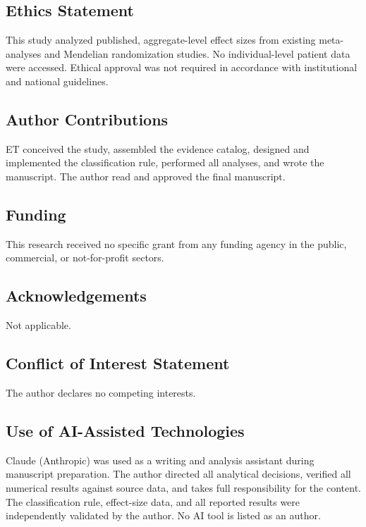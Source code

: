 \documentclass[11pt]{article}
\begin{document}
\subsection*{Ethics Statement}
This study analyzed published, aggregate-level effect sizes from existing meta-analyses and Mendelian randomization studies. No individual-level patient data were accessed. Ethical approval was not required in accordance with institutional and national guidelines.

\subsection*{Author Contributions}
ET conceived the study, assembled the evidence catalog, designed and implemented the classification rule, performed all analyses, and wrote the manuscript. The author read and approved the final manuscript.

\subsection*{Funding}
This research received no specific grant from any funding agency in the public, commercial, or not-for-profit sectors.

\subsection*{Acknowledgements}
Not applicable.

\subsection*{Conflict of Interest Statement}
The author declares no competing interests.

\subsection*{Use of AI-Assisted Technologies}
Claude (Anthropic) was used as a writing and analysis assistant during manuscript preparation. The author directed all analytical decisions, verified all numerical results against source data, and takes full responsibility for the content. The classification rule, effect-size data, and all reported results were independently validated by the author. No AI tool is listed as an author.



\end{document}
